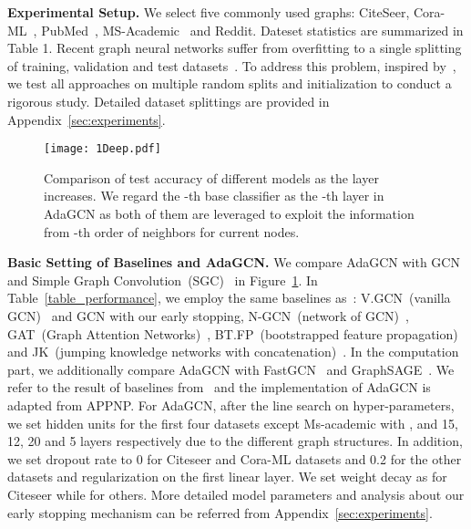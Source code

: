 \documentclass{article} \usepackage{iclr2021_conference,times}
\begin{document}
\textbf{Experimental Setup.} We select five commonly used graphs: CiteSeer, Cora-ML~\citep{bojchevski2017deep,mccallum2000automating}, PubMed~\citep{sen2008collective}, MS-Academic~\citep{shchur2018pitfalls} and Reddit. Dateset statistics are summarized in Table 1. Recent graph neural networks suffer from overfitting to a single splitting of training, validation and test datasets~\citep{klicpera2018predict}. To address this problem, inspired by~\citep{klicpera2018predict}, we test all approaches on multiple random splits and initialization to conduct a rigorous study. Detailed dataset splittings are provided in Appendix~\ref{sec:experiments}.



\begin{figure}[t!]
	\centering
	\texttt{[image: 1Deep.pdf]}
	\caption{Comparison of test accuracy of different models as the layer increases. We regard the -th base classifier as the -th layer in AdaGCN as both of them are leveraged to exploit the information from -th order of neighbors for current nodes.}
	\label{figure_deep}
\end{figure}

\textbf{Basic Setting of Baselines and AdaGCN.} We compare AdaGCN with GCN~\citep{kipf2016semi} and Simple Graph Convolution~(SGC)~\citep{wu2019simplifying} in Figure~\ref{figure_deep}. In Table~\ref{table_performance}, we employ the same baselines as~\citep{klicpera2018predict}:  V.GCN~(vanilla GCN)~\citep{kipf2016semi} and GCN with our early stopping, N-GCN~(network of GCN)~\citep{abu2018n}, GAT~(Graph Attention Networks)~\citep{velivckovic2017graph}, BT.FP~(bootstrapped feature propagation)~\citep{buchnik2018bootstrapped} and JK~(jumping knowledge networks with concatenation)~\citep{xu2018representation}. In the computation part, we additionally compare AdaGCN with FastGCN~\citep{chen2018fastgcn} and GraphSAGE~\citep{hamilton2017inductive}. We refer to the result of baselines from~\citep{klicpera2018predict} and the implementation of AdaGCN is adapted from APPNP. For AdaGCN, after the line search on hyper-parameters, we set  hidden units for the first four datasets except Ms-academic with , and 15, 12, 20 and 5 layers respectively due to the different graph structures. In addition, we set dropout rate to 0 for Citeseer and Cora-ML datasets and 0.2 for the other datasets and  regularization on the first linear layer. We set weight decay as  for Citeseer while  for others. More detailed model parameters and analysis about our early stopping mechanism can be referred from Appendix~\ref{sec:experiments}.
\end{document}
